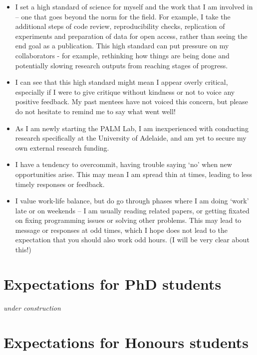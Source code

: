 \documentclass[
]{book}
\providecommand{\tightlist}{%
  \setlength{\itemsep}{0pt}\setlength{\parskip}{0pt}}
\begin{document}
\begin{itemize}
\tightlist
\item
  I set a high standard of science for myself and the work that I am involved in -- one that goes beyond the norm for the field. For example, I take the additional steps of code review, reproducibility checks, replication of experiments and preparation of data for open access, rather than seeing the end goal as a publication. This high standard can put pressure on my collaborators - for example, rethinking how things are being done and potentially slowing research outputs from reaching stages of progress.
\item
  I can see that this high standard might mean I appear overly critical, especially if I were to give critique without kindness or not to voice any positive feedback. My past mentees have not voiced this concern, but please do not hesitate to remind me to say what went well!
\item
  As I am newly starting the PALM Lab, I am inexperienced with conducting research specifically at the University of Adelaide, and am yet to secure my own external research funding.
\item
  I have a tendency to overcommit, having trouble saying `no' when new opportunities arise. This may mean I am spread thin at times, leading to less timely responses or feedback.
\item
  I value work-life balance, but do go through phases where I am doing `work' late or on weekends -- I am usually reading related papers, or getting fixated on fixing programming issues or solving other problems. This may lead to message or responses at odd times, which I hope does not lead to the expectation that you should also work odd hours. (I will be very clear about this!)
\end{itemize}

\hypertarget{student-expectations}{%
\section{Expectations for PhD students}\label{student-expectations}}

\emph{under construction}

\hypertarget{expectations-for-honours-students}{%
\section{Expectations for Honours students}\label{expectations-for-honours-students}}
\end{document}
